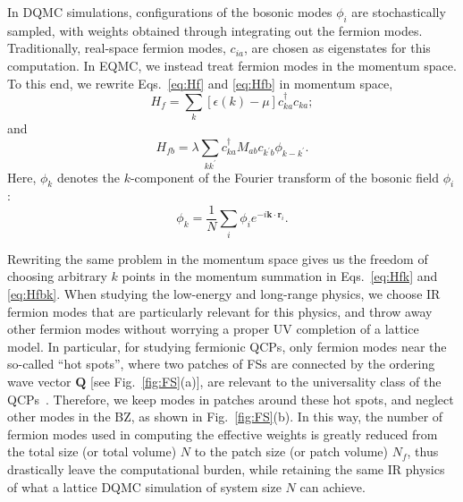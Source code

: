 \documentclass[aps,prx,twocolumn,superscriptaddress,showpacs,floatfix]{revtex4-1}
\begin{document}
In DQMC simulations, configurations of the bosonic modes $\phi_i$ are stochastically sampled, with weights obtained through integrating out the fermion modes. Traditionally, real-space fermion modes, $c_{ia}$, are chosen as eigenstates for this computation. In EQMC, we instead treat fermion modes in the momentum space. To this end, we rewrite Eqs.~\eqref{eq:Hf} and \eqref{eq:Hfb} in momentum space,
\begin{equation}
\label{eq:Hfk}
H_f=\sum_k[\epsilon(k)-\mu]c_{ka}^\dagger c_{ka};
\end{equation}
and
\begin{equation}
\label{eq:Hfbk}
H_{fb}=\lambda\sum_{kk^\prime}c_{ka}^\dagger M_{ab}c_{k^\prime b}
\phi_{k-k^\prime}.
\end{equation}
Here, $\phi_k$ denotes the $k$-component of the Fourier transform of the bosonic field $\phi_i$:
\begin{equation}
  \label{eq:phik}
  \phi_k = \frac1N\sum_i\phi_i e^{-i\bm k\cdot\bm r_i}.
\end{equation}

Rewriting the same problem in the momentum space gives us the freedom of choosing arbitrary $k$ points in the momentum summation in Eqs.~\eqref{eq:Hfk} and \eqref{eq:Hfbk}.
When studying the low-energy and long-range physics, we choose IR fermion modes that are particularly relevant for this physics, and throw away other fermion modes without worrying a proper UV completion of a lattice model.
In particular, for studying fermionic QCPs, only fermion modes near the so-called ``hot spots'', where two patches of FSs are connected by the ordering wave vector $\mathbf{Q}$ [see Fig.~\ref{fig:FS}(a)], are relevant to the universality class of the QCPs~\cite{Metlitski2010b,Abanov2004}.
Therefore, we keep modes in patches around these hot spots, and neglect other modes in the BZ, as shown in Fig.~\ref{fig:FS}(b).
In this way, the number of fermion modes used in computing the effective weights is greatly reduced from the total size (or total volume) $N$ to the patch size (or patch volume) $N_f$, thus drastically leave the computational burden, while retaining the same IR physics of what a lattice DQMC simulation of system size $N$ can achieve.
\end{document}
